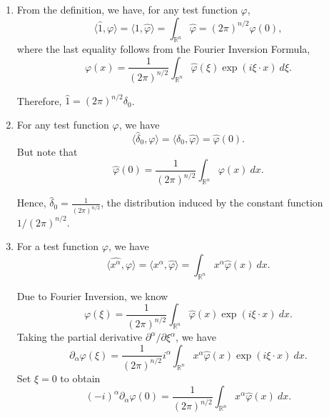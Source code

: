 \documentclass[12pt]{amsart}
\newcommand{\R}{\mathbb{R}}
\newcommand{\wh}[1]{\widehat{#1}}
\begin{document}
\begin{enumerate}[label=(\alph*)]
    \item From the definition, we have, for any test function $\varphi$,
    \begin{equation*}
        \langle\wh 1,\varphi\rangle = \langle 1,\wh\varphi\rangle = \int_{\R^n}\wh\varphi = (2\pi)^{n/2}\varphi(0),
    \end{equation*}
    where the last equality follows from the Fourier Inversion Formula, 
    \begin{equation*}
        \varphi(x) = \frac{1}{(2\pi)^{n/2}}\int_{\R^n}\wh\varphi(\xi)\exp(i\xi\cdot x)~d\xi.
    \end{equation*}

    Therefore, $\wh 1 = (2\pi)^{n/2}\delta_0$.

    \item For any test function $\varphi$, we have 
    \begin{equation*}
        \langle\wh\delta_0,\varphi\rangle = \langle\delta_0,\wh\varphi\rangle = \wh\varphi(0).
    \end{equation*}
    But note that 
    \begin{equation*}
        \wh\varphi(0) = \frac{1}{(2\pi)^{n/2}}\int_{\R^n}\varphi(x)~dx.
    \end{equation*}

    Hence, $\wh\delta_0 = \frac{1}{(2\pi)^{n/2}}$, the distribution induced by the constant function $1/(2\pi)^{n/2}$.

    \item For a test function $\varphi$, we have 
    \begin{equation*}
        \langle\wh{x^{\alpha}},\varphi\rangle = \langle x^{\alpha},\wh\varphi\rangle = \int_{\R^n} x^\alpha\wh\varphi(x)~dx.
    \end{equation*}

    Due to Fourier Inversion, we know 
    \begin{equation*}
        \varphi(\xi) = \frac{1}{(2\pi)^{n/2}}\int_{\R^n}\wh\varphi(x)\exp(i\xi\cdot x)~dx.
    \end{equation*}
    Taking the partial derivative $\partial^\alpha/\partial\xi^\alpha$, we have 
    \begin{equation*}
        \partial_\alpha\varphi(\xi) = \frac{1}{(2\pi)^{n/2}} i^\alpha\int_{\R^n}x^\alpha\wh\varphi(x)\exp(i\xi\cdot x)~dx.
    \end{equation*}
    Set $\xi = 0$ to obtain 
    \begin{equation*}
        (-i)^\alpha\partial_\alpha\varphi(0) = \frac{1}{(2\pi)^{n/2}}\int_{\R^n} x^\alpha\wh\varphi(x)~dx.
    \end{equation*}


\end{enumerate}
\end{document}
